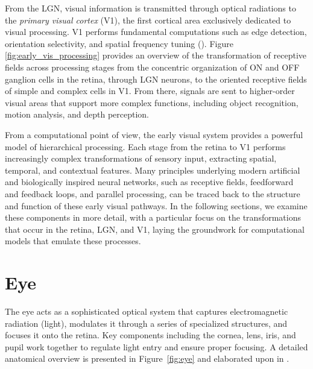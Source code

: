 From the LGN, visual information is transmitted through optical radiations to the \emph{primary visual cortex} (V1), the first cortical area exclusively dedicated to visual processing. V1 performs fundamental computations such as edge detection, orientation selectivity, and spatial frequency tuning (\citet{bear2020neuroscience}). Figure \ref{fig:early_vis_processing} provides an overview of the transformation of receptive fields across processing stages from the concentric organization of ON and OFF ganglion cells in the retina, through LGN neurons, to the oriented receptive fields of simple and complex cells in V1. From there, signals are sent to higher-order visual areas that support more complex functions, including object recognition, motion analysis, and depth perception.

From a computational point of view, the early visual system provides a powerful model of hierarchical processing. Each stage from the retina to V1 performs increasingly complex transformations of sensory input, extracting spatial, temporal, and contextual features. Many principles underlying modern artificial and biologically inspired neural networks, such as receptive fields, feedforward and feedback loops, and parallel processing, can be traced back to the structure and function of these early visual pathways. In the following sections, we examine these components in more detail, with a particular focus on the transformations that occur in the retina, LGN, and V1, laying the groundwork for computational models that emulate these processes.

\section{Eye}
\label{sec:eye}

The eye acts as a sophisticated optical system that captures electromagnetic radiation (light), modulates it through a series of specialized structures, and focuses it onto the retina. Key components including the cornea, lens, iris, and pupil work together to regulate light entry and ensure proper focusing. A detailed anatomical overview is presented in Figure~\ref{fig:eye} and elaborated upon in \citet{snell2013clinical}.

